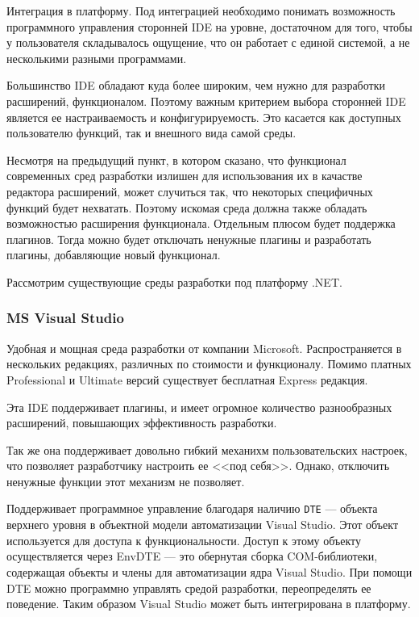Интеграция в платформу. Под интеграцией необходимо понимать возможность программного управления сторонней IDE на уровне, достаточном для того, чтобы у пользователя складывалось ощущение, что он работает с единой системой, а не несколькими разными программами.

Большинство IDE обладают куда более широким, чем нужно для разработки расширений, функционалом. Поэтому важным критерием выбора сторонней IDE является ее настраиваемость и конфигурируемость. Это касается как доступных пользователю функций, так и внешного вида самой среды.

Несмотря на предыдущий пункт, в котором сказано, что функционал современных сред разработки излишен для использования их в качастве редактора расширений, может случиться так, что некоторых специфичных функций будет нехватать. Поэтому искомая среда должна также обладать возможностью расширения функционала. Отдельным плюсом будет поддержка плагинов. Тогда можно будет отключать ненужные плагины и разработать плагины, добавляющие новый функционал.

Рассмотрим существующие среды разработки под платформу .NET.

\subsubsection{MS Visual Studio}

Удобная и мощная среда разработки от компании Microsoft. Распространяется в нескольких редакциях, различных по стоимости и функционалу. Помимо платных Professional и Ultimate версий существует бесплатная Express редакция.

Эта IDE поддерживает плагины, и имеет огромное количество разнообразных расширений, повышающих эффективность разработки.

Так же она поддерживает довольно гибкий механихм пользовательских настроек, что позволяет разработчику настроить ее <<под себя>>. Однако, отключить ненужные функции этот механизм не позволяет.

Поддерживает программное управление благодаря наличию  {\tt DTE} --- объекта верхнего уровня в объектной модели автоматизации Visual Studio. Этот объект используется для доступа к функциональности. Доступ к этому объекту осуществляется через EnvDTE — это обернутая сборка COM-библиотеки, содержащая объекты и члены для автоматизации ядра Visual Studio. При помощи DTE можно программно управлять средой разработки, переопределять ее поведение. Таким образом Visual Studio может быть интегрирована в платформу.

